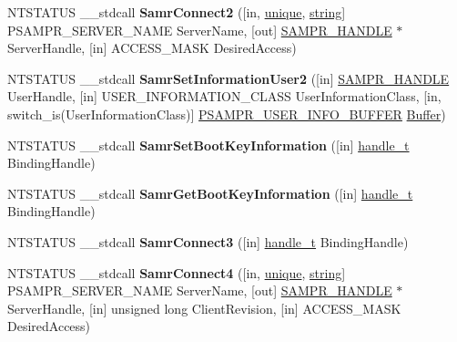 \begin{DoxyCompactItemize}
\mbox{\label{interfacesamr_a9c2abd36c6d667db4867c454ee84f101}} 
N\+T\+S\+T\+A\+T\+US \+\_\+\+\_\+stdcall {\bfseries Samr\+Connect2} (\mbox{[}in, \hyperlink{interfaceunique}{unique}, \hyperlink{structstring}{string}\mbox{]} P\+S\+A\+M\+P\+R\+\_\+\+S\+E\+R\+V\+E\+R\+\_\+\+N\+A\+ME Server\+Name, \mbox{[}out\mbox{]} \hyperlink{interfacevoid}{S\+A\+M\+P\+R\+\_\+\+H\+A\+N\+D\+LE} $\ast$Server\+Handle, \mbox{[}in\mbox{]} A\+C\+C\+E\+S\+S\+\_\+\+M\+A\+SK Desired\+Access)
\item 
\mbox{\label{interfacesamr_a1dedd1d6abbb0b46bb32029e4f554291}} 
N\+T\+S\+T\+A\+T\+US \+\_\+\+\_\+stdcall {\bfseries Samr\+Set\+Information\+User2} (\mbox{[}in\mbox{]} \hyperlink{interfacevoid}{S\+A\+M\+P\+R\+\_\+\+H\+A\+N\+D\+LE} User\+Handle, \mbox{[}in\mbox{]} U\+S\+E\+R\+\_\+\+I\+N\+F\+O\+R\+M\+A\+T\+I\+O\+N\+\_\+\+C\+L\+A\+SS User\+Information\+Class, \mbox{[}in, switch\+\_\+is(User\+Information\+Class)\mbox{]} \hyperlink{union___s_a_m_p_r___u_s_e_r___i_n_f_o___b_u_f_f_e_r}{P\+S\+A\+M\+P\+R\+\_\+\+U\+S\+E\+R\+\_\+\+I\+N\+F\+O\+\_\+\+B\+U\+F\+F\+ER} \hyperlink{class_buffer}{Buffer})
\item 
\mbox{\label{interfacesamr_a2be638323092dc5448b7643a959c87c1}} 
N\+T\+S\+T\+A\+T\+US \+\_\+\+\_\+stdcall {\bfseries Samr\+Set\+Boot\+Key\+Information} (\mbox{[}in\mbox{]} \hyperlink{interfacevoid}{handle\+\_\+t} Binding\+Handle)
\item 
\mbox{\label{interfacesamr_a5d88076cef097fefbe9384dfe5bdbc79}} 
N\+T\+S\+T\+A\+T\+US \+\_\+\+\_\+stdcall {\bfseries Samr\+Get\+Boot\+Key\+Information} (\mbox{[}in\mbox{]} \hyperlink{interfacevoid}{handle\+\_\+t} Binding\+Handle)
\item 
\mbox{\label{interfacesamr_a9a5ffd15e1745cc5ce7281cf2a14deee}} 
N\+T\+S\+T\+A\+T\+US \+\_\+\+\_\+stdcall {\bfseries Samr\+Connect3} (\mbox{[}in\mbox{]} \hyperlink{interfacevoid}{handle\+\_\+t} Binding\+Handle)
\item 
\mbox{\label{interfacesamr_a687018e19f08e33b8a4cdacb5e59ca10}} 
N\+T\+S\+T\+A\+T\+US \+\_\+\+\_\+stdcall {\bfseries Samr\+Connect4} (\mbox{[}in, \hyperlink{interfaceunique}{unique}, \hyperlink{structstring}{string}\mbox{]} P\+S\+A\+M\+P\+R\+\_\+\+S\+E\+R\+V\+E\+R\+\_\+\+N\+A\+ME Server\+Name, \mbox{[}out\mbox{]} \hyperlink{interfacevoid}{S\+A\+M\+P\+R\+\_\+\+H\+A\+N\+D\+LE} $\ast$Server\+Handle, \mbox{[}in\mbox{]} unsigned long Client\+Revision, \mbox{[}in\mbox{]} A\+C\+C\+E\+S\+S\+\_\+\+M\+A\+SK Desired\+Access)

\end{DoxyCompactItemize}
